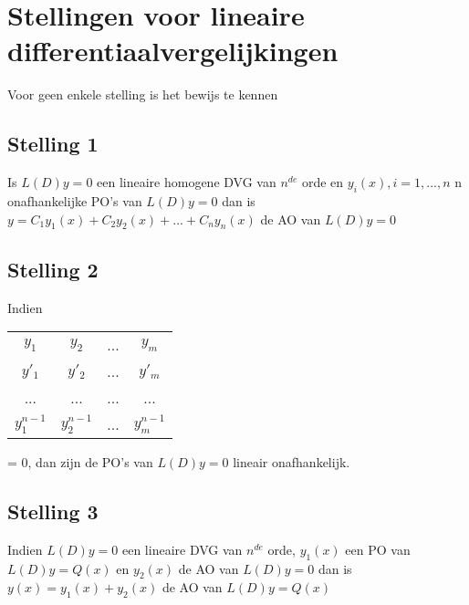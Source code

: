 \section{Stellingen voor lineaire differentiaalvergelijkingen}
Voor geen enkele stelling is het bewijs te kennen
\subsection{Stelling 1}
Is $L(D)y = 0$ een lineaire homogene DVG van $n^{de}$ orde en $y_i(x), i = 1, ..., n$ n onafhankelijke PO's van $L(D)y = 0$ dan is $y = C_1y_1(x) + C_2y_2(x) + ... + C_ny_n(x)$ de AO van $L(D)y = 0$

\subsection{Stelling 2}
Indien 
\begin{tabular}{| c c c c |}
 $y_1$          & $y_2$         & ... & $y_m$ \\
 $y'_1$         & $y'_2$        & ... & $y'_m$ \\
 ...            & ...           & ... & ...   \\
 $y^{n - 1}_1$  & $y^{n - 1}_2$ & ... & $y^{n - 1}_m$ 
\end{tabular} = 0, dan zijn de PO's van $L(D)y = 0$ lineair onafhankelijk.
\subsection{Stelling 3}
Indien $L(D)y = 0$ een lineaire DVG van $n^{de}$ orde, $y_1(x)$ een PO van $L(D)y = Q(x)$ en $y_2(x)$ de AO van $L(D)y = 0$ dan is $y(x) = y_1(x) + y_2(x)$ de AO van $L(D)y = Q(x)$
